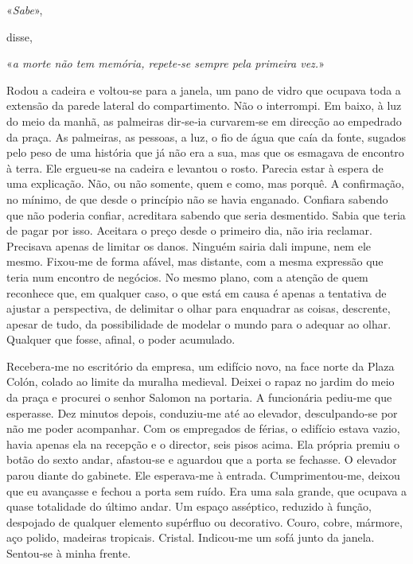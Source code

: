 «\emph{Sabe}»,

disse,

«\emph{a morte não tem memória, repete­‑se sempre pela primeira vez.}»

Rodou a cadeira e voltou­‑se para a janela, um pano de vidro que ocupava
toda a extensão da parede lateral do compartimento. Não o interrompi. Em
baixo, à luz do meio da manhã, as palmeiras dir­‑se­‑ia curvarem­‑se em
direcção ao empedrado da praça. As palmeiras, as pessoas, a luz, o fio
de água que caía da fonte, sugados pelo peso de uma história que já não
era a sua, mas que os esmagava de encontro à terra. Ele ergueu­‑se na
cadeira e levantou o rosto. Parecia estar à espera de uma explicação.
Não, ou não somente, quem e como, mas porquê. A confirmação, no mínimo,
de que desde o princípio não se havia enganado. Confiara sabendo que não
poderia confiar, acreditara sabendo que seria desmentido. Sabia que
teria de pagar por isso. Aceitara o preço desde o primeiro dia, não iria
reclamar. Precisava apenas de limitar os danos. Ninguém sairia dali
impune, nem ele mesmo. Fixou­‑me de forma afável, mas distante, com a
mesma expressão que teria num encontro de negócios. No mesmo plano, com
a atenção de quem reconhece que, em qualquer caso, o que está em causa é
apenas a tentativa de ajustar a perspectiva, de delimitar o olhar para
enquadrar as coisas, descrente, apesar de tudo, da possibilidade de
modelar o mundo para o adequar ao olhar. Qualquer que fosse, afinal, o
poder acumulado.

Recebera­‑me no escritório da empresa, um edifício novo, na face norte
da Plaza Colón, colado ao limite da muralha medieval. Deixei o rapaz no
jardim do meio da praça e procurei o senhor Salomon na portaria. A
funcionária pediu­‑me que esperasse. Dez minutos depois, conduziu­‑me
até ao elevador, desculpando­‑se por não me poder acompanhar. Com os
empregados de férias, o edifício estava vazio, havia apenas ela na
recepção e o director, seis pisos acima. Ela própria premiu o botão do
sexto andar, afastou­‑se e aguardou que a porta se fechasse. O elevador
parou diante do gabinete. Ele esperava­‑me à entrada. Cumprimentou­‑me,
deixou que eu avançasse e fechou a porta sem ruído. Era uma sala grande,
que ocupava a quase totalidade do último andar. Um espaço asséptico,
reduzido à função, despojado de qualquer elemento supérfluo ou
decorativo. Couro, cobre, mármore, aço polido, madeiras tropicais.
Cristal. Indicou­‑me um sofá junto da janela. Sentou­‑se à minha frente.

